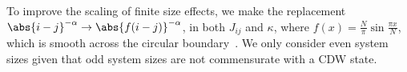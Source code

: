 To improve the scaling of finite size effects, we make the replacement \(\abs{i - j}^{-\alpha} \rightarrow \abs{f(i - j)}^{-\alpha}\), in both \(J_{ij}\) and \(\kappa\), where \(f(x) = \frac{N}{\pi}\sin \frac{\pi x}{N}\), which is smooth across the circular boundary~\autocite{fukuiOrderNClusterMonte2009}. We only consider even system sizes given that odd system sizes are not commensurate with a CDW state.

\begin{Shaded}
\begin{Highlighting}[]

\end{Highlighting}
\end{Shaded}
